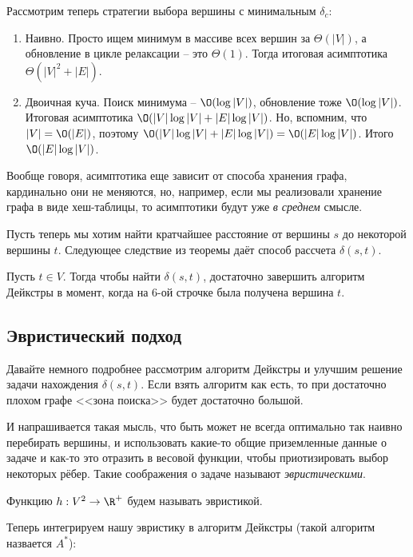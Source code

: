 Рассмотрим теперь стратегии выбора вершины с минимальным $\delta_c$:
\begin{enumerate}
    \item Наивно. Просто ищем минимум в массиве всех вершин за $\Theta(|V|)$, а обновление в цикле релаксации -- это $\Theta(1)$. Тогда итоговая асимптотика $\Theta\left(|V|^2 + |E|\right)$.
    \item Двоичная куча. Поиск минимума -- $\O(\log |V|)$, обновление тоже $\O(\log |V|)$. Итоговая асимптотика $\O(|V| \log |V| + |E| \log |V|)$. Но, вспомним, что $|V| = \O(|E|)$, поэтому $\O(|V| \log |V| + |E| \log |V|) = \O(|E| \log |V|)$. Итого $\O(|E| \log |V|)$.
\end{enumerate}

\Note Вообще говоря, асимптотика еще зависит от способа хранения графа, кардинально они не меняются, но, например, если мы реализовали хранение графа в виде хеш-таблицы, то асимптотики будут уже \textit{в среднем} смысле.

Пусть теперь мы хотим найти кратчайшее расстояние от вершины $s$ до некоторой вершины $t$. Следующее следствие из теоремы даёт способ рассчета $\delta(s, t)$.

\Cons Пусть $t \in V$. Тогда чтобы найти $\delta(s, t)$, достаточно завершить алгоритм Дейкстры в момент, когда на 6-ой строчке была получена вершина $t$.

\subsection{Эвристический подход}

Давайте немного подробнее рассмотрим алгоритм Дейкстры и улучшим решение задачи нахождения $\delta(s, t)$. Если взять алгоритм как есть, то при достаточно плохом графе <<зона поиска>> будет достаточно большой.

И напрашивается такая мысль, что быть может не всегда оптимально так наивно перебирать вершины, и использовать какие-то общие приземленные данные о задаче и как-то это отразить в весовой функции, чтобы приотизировать выбор некоторых рёбер. Такие соображения о задаче называют \textit{эвристическими}.

\Def Функцию $h: V^2 \to \R^+$ будем называть эвристикой.

Теперь интегрируем нашу эвристику в алгоритм Дейкстры (такой алгоритм назвается $A^*$):

